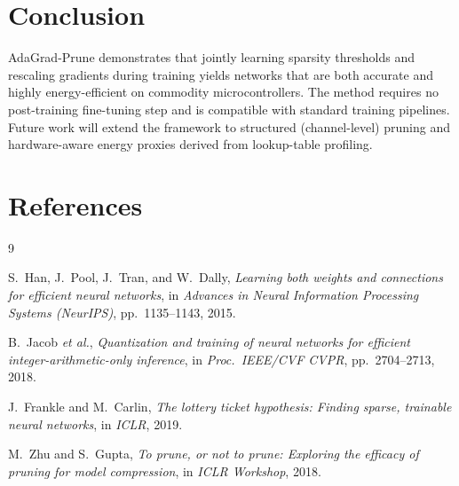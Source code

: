\documentclass[10pt,twocolumn]{article}
\begin{document}
\section{Conclusion}

AdaGrad-Prune demonstrates that jointly learning sparsity thresholds and
rescaling gradients during training yields networks that are both
accurate and highly energy-efficient on commodity microcontrollers.
The method requires no post-training fine-tuning step and is compatible
with standard training pipelines.  Future work will extend the framework
to structured (channel-level) pruning and hardware-aware energy proxies
derived from lookup-table profiling.

\section{References}
\begingroup
\renewcommand{\section}[2]{}   %
\begin{thebibliography}{9}

S.~Han, J.~Pool, J.~Tran, and W.~Dally,
\textit{Learning both weights and connections for efficient neural networks},
in \textit{Advances in Neural Information Processing Systems (NeurIPS)},
pp.~1135--1143, 2015.

B.~Jacob \textit{et al.},
\textit{Quantization and training of neural networks for efficient
integer-arithmetic-only inference},
in \textit{Proc.\ IEEE/CVF CVPR}, pp.~2704--2713, 2018.

J.~Frankle and M.~Carlin,
\textit{The lottery ticket hypothesis: Finding sparse, trainable neural networks},
in \textit{ICLR}, 2019.

M.~Zhu and S.~Gupta,
\textit{To prune, or not to prune: Exploring the efficacy of pruning for
model compression},
in \textit{ICLR Workshop}, 2018.

\end{thebibliography}
\endgroup
\end{document}
